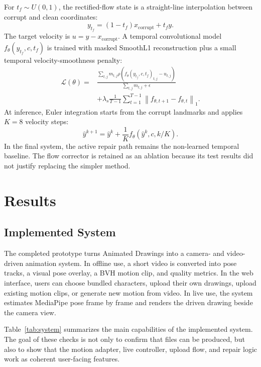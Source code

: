 \documentclass[10pt,twocolumn,letterpaper]{article}
\begin{document}
For $t_f\sim U(0,1)$, the rectified-flow state is a straight-line interpolation between corrupt and clean coordinates:
\begin{equation}
y_{t_f}=(1-t_f)x_{\mathrm{corrupt}}+t_f y.
\end{equation}
The target velocity is $u=y-x_{\mathrm{corrupt}}$. A temporal convolutional model $f_\theta(y_{t_f},c,t_f)$ is trained with masked SmoothL1 reconstruction plus a small temporal velocity-smoothness penalty:
\begin{equation}
\begin{aligned}
\mathcal{L}(\theta)=
&\frac{\sum_{t,j}m_{t,j}\rho\left(f_\theta(y_{t_f},c,t_f)_{t,j}-u_{t,j}\right)}
{\sum_{t,j}m_{t,j}+\epsilon}\\
&+\lambda_s\frac{1}{T-1}\sum_{t=1}^{T-1}
\left\|f_{\theta,t+1}-f_{\theta,t}\right\|_1 .
\end{aligned}
\label{eq:flow-loss}
\end{equation}
At inference, Euler integration starts from the corrupt landmarks and applies $K=8$ velocity steps:
\begin{equation}
\hat{y}^{k+1}=\hat{y}^{k}+\frac{1}{K}f_\theta(\hat{y}^{k},c,k/K).
\end{equation}
In the final system, the active repair path remains the non-learned temporal baseline. The flow corrector is retained as an ablation because its test results did not justify replacing the simpler method.

\section{Results}

\subsection{Implemented System}

The completed prototype turns Animated Drawings into a camera- and video-driven animation system. In offline use, a short video is converted into pose tracks, a visual pose overlay, a BVH motion clip, and quality metrics. In the web interface, users can choose bundled characters, upload their own drawings, upload existing motion clips, or generate new motion from video. In live use, the system estimates MediaPipe pose frame by frame and renders the driven drawing beside the camera view.

Table~\ref{tab:system} summarizes the main capabilities of the implemented system. The goal of these checks is not only to confirm that files can be produced, but also to show that the motion adapter, live controller, upload flow, and repair logic work as coherent user-facing features.
\end{document}
